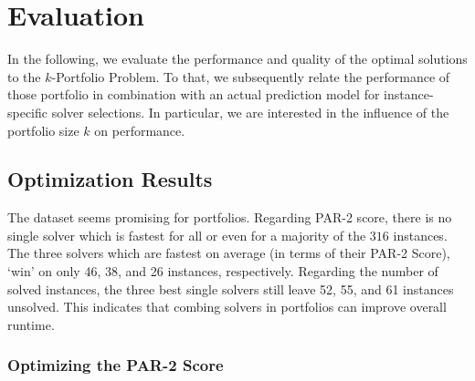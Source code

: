 \documentclass[conference]{IEEEtran}
\begin{document}
\section{Evaluation}
\label{sec:evaluation}

In the following, we evaluate the performance and quality of the optimal solutions to the $k$-Portfolio Problem. 
To that, we subsequently relate the performance of those portfolio in combination with an actual prediction model for instance-specific solver selections. 
In particular, we are interested in the influence of the portfolio size $k$ on performance. 

\subsection{Optimization Results}

The dataset seems promising for portfolios.
Regarding \mbox{PAR-2} score, there is no single solver which is fastest for all or even for a majority of the $316$ instances. 
The three solvers which are fastest on average (in terms of their PAR-2 Score), `win' on only 46, 38, and 26 instances, respectively. 
Regarding the number of solved instances, the three best single solvers still leave 52, 55, and 61 instances unsolved. 
This indicates that combing solvers in portfolios can improve overall runtime.

\subsubsection{Optimizing the PAR-2 Score}
\end{document}
